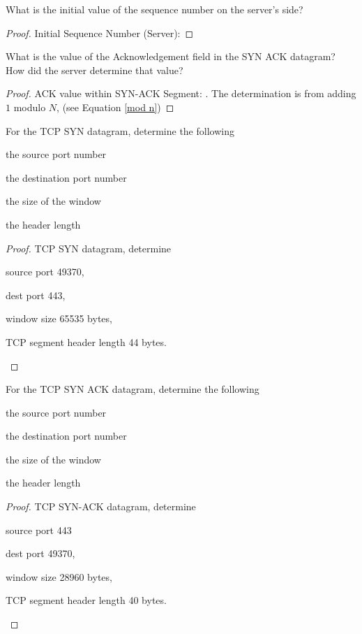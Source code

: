 \documentclass[../main.tex]{subfiles}
\begin{document}
\begin{wts}
	What is the initial value of the sequence number on the server’s side?
\end{wts}
\begin{proof}
    Initial Sequence Number (Server): 		
\end{proof}
\newpage

\begin{wts}
	What is the value of the Acknowledgement field in the SYN ACK datagram? How did the server determine that value?
\end{wts}
\begin{proof}
    ACK value within SYN-ACK Segment: 	. The determination is from adding $1$ modulo $N$, (see Equation \eqref{mod n})
\end{proof}
\newpage


\begin{wts}
	For the TCP SYN datagram, determine the following
	\begin{enumalpha}
		\item the source port number
		\item the destination port number
		\item the size of the window
		\item the header length
	\end{enumalpha}
\end{wts}
\begin{proof}
    TCP SYN datagram, determine
    \begin{enumalpha}
        \item source port 49370, 
        \item dest port 443,
        \item window size 65535 bytes,
        \item TCP segment header length 44 bytes.    
    \end{enumalpha}
\end{proof}
\newpage


\begin{wts}
	For the TCP SYN ACK datagram, determine the following
	\begin{enumalpha}
		\item the source port number
		\item the destination port number
		\item the size of the window
		\item the header length
	\end{enumalpha}
\end{wts}
\begin{proof}
TCP SYN-ACK datagram, determine
\begin{enumalpha}
    \item source port 443 
	\item dest port 49370,
	\item window size 28960 bytes,
	\item TCP segment header length 40 bytes.
\end{enumalpha}
\end{proof}
\newpage
\end{document}
